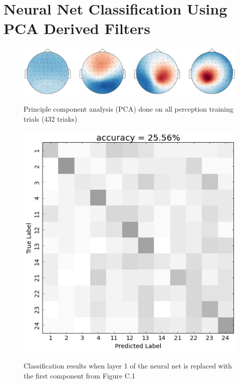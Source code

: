 \chapter{Neural Net Classification Using PCA Derived Filters} \label{appendix:PCAInvestigation}
\begin{figure}[h] 
  \begin{center}
   \includegraphics[width=.5\textwidth,keepaspectratio=true]{Figures/PCA_SVM}
   \\\vspace{-0.8em}
    \caption{Principle component analysis (PCA) done on all perception training trials (432 triaks)}
    \label{fig:PCA_SVM}
  \end{center}
  \vspace{-1em}
\end{figure}

\begin{figure}[h] 
  \begin{center}
    \includegraphics[scale=0.5]{Figures/PC0_confusion}
   \\\vspace{-0.8em}
    \caption{Classification results when layer 1 of the neural net is replaced with the first component from Figure C.1}
    \label{fig:PC0_confusion}
  \end{center}
  \vspace{-1em}
\end{figure}

